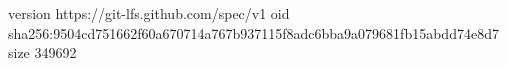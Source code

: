 version https://git-lfs.github.com/spec/v1
oid sha256:9504cd751662f60a670714a767b937115f8adc6bba9a079681fb15abdd74e8d7
size 349692
